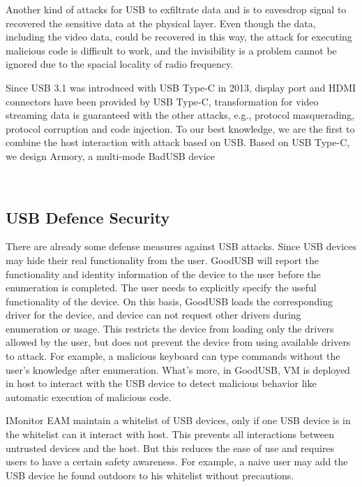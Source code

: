 Another kind of attacks for USB to exfiltrate data\cite{smartphone}\cite{poweremi} and \cite{usbdriver} is to eavesdrop signal to recovered the sensitive data at the physical layer. Even though the data, including the video data, could be recovered in this way, the attack for executing malicious code is difficult to work, and the invisibility is a problem cannot be ignored due to the spacial locality of radio frequency. 

Since USB 3.1 was introduced with USB Type-C in 2013, display port and HDMI connectors have been provided by USB Type-C, transformation for video streaming data is guaranteed with the other attacks, e.g., protocol masquerading,  protocol corruption and code injection. 
To our best knowledge, we are the first to combine the host interaction with attack based on USB. Based on USB Type-C, we design Armory, a multi-mode BadUSB device 


\\

\subsection{USB Defence Security}

There are already some defense measures against USB attacks. Since USB devices may hide their real functionality from the user. GoodUSB\cite{tian2015defending} will report the functionality and identity information of the device to the user before the enumeration is completed. The user needs to explicitly specify the useful functionality of the device. On this basis, GoodUSB loads the corresponding driver for the device, and device can not request other drivers during enumeration or usage. This restricts the device from loading only the drivers allowed by the user, but does not prevent the device from using available drivers to attack. For example, a malicious keyboard can type commands without the user's knowledge after enumeration. What's more, in GoodUSB, VM is deployed in host to interact with the USB device to detect malicious behavior like automatic execution of malicious code.
 
IMonitor EAM\cite{IMonitor} maintain a whitelist of USB devices, only if one USB device is in the whitelist can it interact with host. This prevents all interactions between untrusted devices and the host. But this reduces the ease of use and requires users to have a certain safety awareness. For example, a naive user may add the USB device he found outdoors to his whitelist without precautions.

